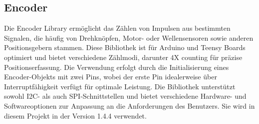 \subsection{Encoder}

Die Encoder Library ermöglicht das Zählen von Impulsen aus bestimmten Signalen, die häufig von Drehknöpfen, Motor- oder Wellensensoren sowie anderen Positionsgebern stammen. Diese Bibliothek ist für Arduino und Teensy Boards optimiert und bietet verschiedene Zählmodi, darunter 4X counting für präzise Positionserfassung. Die Verwendung erfolgt durch die Initialisierung eines Encoder-Objekts mit zwei Pins, wobei der erste Pin idealerweise über Interruptfähigkeit verfügt für optimale Leistung. Die Bibliothek unterstützt sowohl I2C- als auch SPI-Schnittstellen und bietet verschiedene Hardware- und Softwareoptionen zur Anpassung an die Anforderungen des Benutzers. Sie wird in diesem Projekt in der Version 1.4.4 verwendet.\cite{PaulStoffregen.2024}



